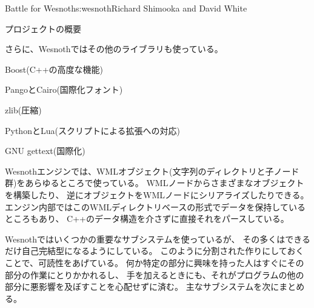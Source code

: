 \begin{aosachapter}{Battle for Wesnoth}{s:wesnoth}{Richard Shimooka and David White}
\begin{aosasect1}{プロジェクトの概要}
\begin{aosaitemize}
\end{aosaitemize}

さらに、Wesnothではその他のライブラリも使っている。

\begin{aosaitemize}

  \item Boost(C++の高度な機能)

  \item PangoとCairo(国際化フォント)

  \item zlib(圧縮)

  \item PythonとLua(スクリプトによる拡張への対応)

  \item GNU gettext(国際化)

\end{aosaitemize}

Wesnothエンジンでは、WMLオブジェクト(文字列のディレクトリと子ノード群)をあらゆるところで使っている。
WMLノードからさまざまなオブジェクトを構築したり、
逆にオブジェクトをWMLノードにシリアライズしたりできる。
エンジン内部ではこのWMLディレクトリベースの形式でデータを保持しているところもあり、
C++のデータ構造を介さずに直接それをパースしている。

Wesnothではいくつかの重要なサブシステムを使っているが、
その多くはできるだけ自己完結型になるようにしている。
このように分割された作りにしておくことで、可読性をあげている。
何か特定の部分に興味を持った人はすぐにその部分の作業にとりかかれるし、
手を加えるときにも、それがプログラムの他の部分に悪影響を及ぼすことを心配せずに済む。
主なサブシステムを次にまとめる。


\end{aosasect1}
\end{aosachapter}
